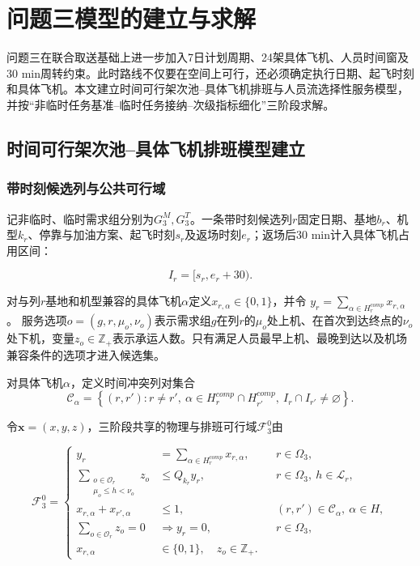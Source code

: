 
\section{问题三模型的建立与求解}\label{sec:q3}

问题三在联合取送基础上进一步加入7日计划周期、24架具体飞机、人员时间窗及30 min周转约束。此时路线不仅要在空间上可行，还必须确定执行日期、起飞时刻和具体飞机。本文建立时间可行架次池--具体飞机排班与人员流选择性服务模型，并按“非临时任务基准--临时任务接纳--次级指标细化”三阶段求解。

\subsection{时间可行架次池--具体飞机排班模型建立}\label{subsec:q3-model}

\subsubsection{带时刻候选列与公共可行域}

记非临时、临时需求组分别为$G_3^M,G_3^T$。一条带时刻候选列$r$固定日期、基地$b_r$、机型$k_r$、停靠与加油方案、起飞时刻$s_r$及返场时刻$e_r$；返场后30 min计入具体飞机占用区间：

\[
I_r=[s_r,e_r+30).
\tag{8-1}\label{eq:q3-occupancy-interval}
\]

对与列$r$基地和机型兼容的具体飞机$\alpha$定义$x_{r,\alpha}\in\{0,1\}$，并令
$y_r=\sum_{\alpha\in H_r^{comp}}x_{r,\alpha}$。
服务选项$o=(g,r,\mu_o,\nu_o)$表示需求组$g$在列$r$的$\mu_o$处上机、在首次到达终点的$\nu_o$处下机，变量$z_o\in\mathbb Z_+$表示承运人数。只有满足人员最早上机、最晚到达以及机场兼容条件的选项才进入候选集。

对具体飞机$\alpha$，定义时间冲突列对集合
\[
\mathcal C_\alpha=
\left\{
(r,r'):
r\neq r',\ 
\alpha\in H_r^{comp}\cap H_{r'}^{comp},\
I_r\cap I_{r'}\neq\varnothing
\right\}.
\tag{8-2}\label{eq:q3-conflict-set}
\]

令$\mathbf{x}=(x,y,z)$，三阶段共享的物理与排班可行域$\mathcal F_3^0$由

\[
\mathcal F_3^0=
\left\{
\begin{aligned}
y_r&=\sum_{\alpha\in H_r^{comp}}x_{r,\alpha},
&&r\in\Omega_3,\\
\sum_{\substack{o\in\mathcal O_r\\ \mu_o\le h<\nu_o}}z_o
&\le Q_{k_r}y_r,
&&r\in\Omega_3,\ h\in\mathcal L_r,\\
x_{r,\alpha}+x_{r',\alpha}&\le1,
&&(r,r')\in\mathcal C_\alpha,\ \alpha\in H,\\
\sum_{o\in\mathcal O_r}z_o=0&\Rightarrow y_r=0,
&&r\in\Omega_3,\\
x_{r,\alpha}&\in\{0,1\},\quad z_o\in\mathbb Z_+.
\end{aligned}
\right.
\tag{8-3}\label{eq:q3-feasible-set}
\]

